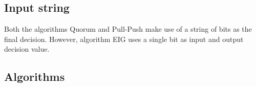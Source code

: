 \subsection{Input string}
Both the algorithms Quorum and Pull-Push  make use of a string of bits as the final decision. However, algorithm EIG uses a single bit as input and output decision value.


\subsection{Algorithms}
%
%
%
